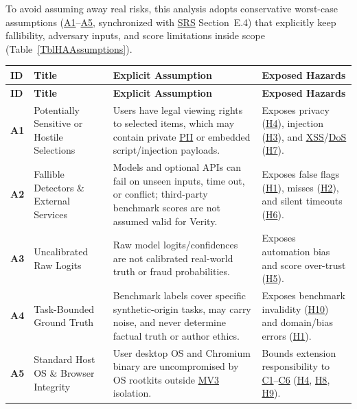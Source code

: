 \documentclass[11pt]{article}
\newcommand{\DoS}{\hyperlink{ha-acr-dos}{DoS}}
\newcommand{\MVThree}{\hyperlink{ha-acr-mv3}{MV3}}
\newcommand{\PII}{\hyperlink{ha-acr-pii}{PII}}
\newcommand{\SRS}{\hyperlink{ha-acr-srs}{SRS}}
\newcommand{\XSS}{\hyperlink{ha-acr-xss}{XSS}}
\begin{document}
To avoid assuming away real risks, this analysis adopts conservative worst-case assumptions (\hyperref[assump:A1]{A1}--\hyperref[assump:A5]{A5}, synchronized with \SRS{} Section~E.4) that explicitly keep fallibility, adversary inputs, and score limitations inside scope (Table~\ref{TblHAAssumptions}).

\begin{tabularx}{\textwidth}{l P{3.3cm} Y Y}
\caption{Critical Domain and Infrastructure Assumptions (\hyperref[assump:A1]{A1}--\hyperref[assump:A5]{A5})} \label{TblHAAssumptions}\\
\toprule
\textbf{ID} & \textbf{Title} & \textbf{Explicit Assumption} & \textbf{Exposed Hazards}\\
\midrule
\endfirsthead
\toprule
\textbf{ID} & \textbf{Title} & \textbf{Explicit Assumption} & \textbf{Exposed Hazards}\\
\midrule
\endhead
\bottomrule
\endfoot
{}\label{assump:A1}\textbf{A1} & Potentially Sensitive or Hostile Selections & Users have legal viewing rights to selected items, which may contain private \PII{} or embedded script/injection payloads. & Exposes privacy (\hyperref[haz:H4]{H4}), injection (\hyperref[haz:H3]{H3}), and \XSS{}/\DoS{} (\hyperref[haz:H7]{H7}).\\
\midrule
{}\label{assump:A2}\textbf{A2} & Fallible Detectors \& External Services & Models and optional APIs can fail on unseen inputs, time out, or conflict; third-party benchmark scores are not assumed valid for Verity. & Exposes false flags (\hyperref[haz:H1]{H1}), misses (\hyperref[haz:H2]{H2}), and silent timeouts (\hyperref[haz:H6]{H6}).\\
\midrule
{}\label{assump:A3}\textbf{A3} & Uncalibrated Raw Logits & Raw model logits/confidences are not calibrated real-world truth or fraud probabilities. & Exposes automation bias and score over-trust (\hyperref[haz:H5]{H5}).\\
\midrule
{}\label{assump:A4}\textbf{A4} & Task-Bounded Ground Truth & Benchmark labels cover specific synthetic-origin tasks, may carry noise, and never determine factual truth or author ethics. & Exposes benchmark invalidity (\hyperref[haz:H10]{H10}) and domain/bias errors (\hyperref[haz:H1]{H1}).\\
\midrule
{}\label{assump:A5}\textbf{A5} & Standard Host OS \& Browser Integrity & User desktop OS and Chromium binary are uncompromised by OS rootkits outside \MVThree{} isolation. & Bounds extension responsibility to \hyperref[comp:C1]{C1}--\hyperref[comp:C6]{C6} (\hyperref[haz:H4]{H4}, \hyperref[haz:H8]{H8}, \hyperref[haz:H9]{H9}).\\
\end{tabularx}
\end{document}
